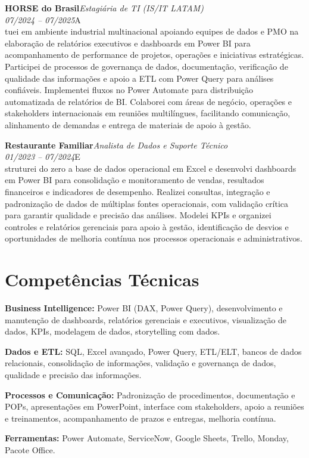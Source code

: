 \documentclass[11pt,a4paper]{article}
\newcommand{\cvrole}[4]{%
  \vspace{4pt}%
  {\bfseries\color{accentcolor}#1}\hfill{\itshape #2}\\[-2pt]%
  {\itshape #3}\hfill #4\\[6pt]%
}
\begin{document}
\cvrole{HORSE do Brasil}{Estagiária de TI (IS/IT LATAM)}{07/2024 -- 07/2025}

Atuei em ambiente industrial multinacional apoiando equipes de dados e PMO na elaboração de relatórios executivos e dashboards em Power BI para acompanhamento de performance de projetos, operações e iniciativas estratégicas. Participei de processos de governança de dados, documentação, verificação de qualidade das informações e apoio a ETL com Power Query para análises confiáveis. Implementei fluxos no Power Automate para distribuição automatizada de relatórios de BI. Colaborei com áreas de negócio, operações e stakeholders internacionais em reuniões multilíngues, facilitando comunicação, alinhamento de demandas e entrega de materiais de apoio à gestão.

\cvrole{Restaurante Familiar}{Analista de Dados e Suporte Técnico}{01/2023 -- 07/2024}

Estruturei do zero a base de dados operacional em Excel e desenvolvi dashboards em Power BI para consolidação e monitoramento de vendas, resultados financeiros e indicadores de desempenho. Realizei consultas, integração e padronização de dados de múltiplas fontes operacionais, com validação crítica para garantir qualidade e precisão das análises. Modelei KPIs e organizei controles e relatórios gerenciais para apoio à gestão, identificação de desvios e oportunidades de melhoria contínua nos processos operacionais e administrativos.

\section{Competências Técnicas}

\textbf{Business Intelligence:} Power BI (DAX, Power Query), desenvolvimento e manutenção de dashboards, relatórios gerenciais e executivos, visualização de dados, KPIs, modelagem de dados, storytelling com dados.

\textbf{Dados e ETL:} SQL, Excel avançado, Power Query, ETL/ELT, bancos de dados relacionais, consolidação de informações, validação e governança de dados, qualidade e precisão das informações.

\textbf{Processos e Comunicação:} Padronização de procedimentos, documentação e POPs, apresentações em PowerPoint, interface com stakeholders, apoio a reuniões e treinamentos, acompanhamento de prazos e entregas, melhoria contínua.

\textbf{Ferramentas:} Power Automate, ServiceNow, Google Sheets, Trello, Monday, Pacote Office.
\end{document}
